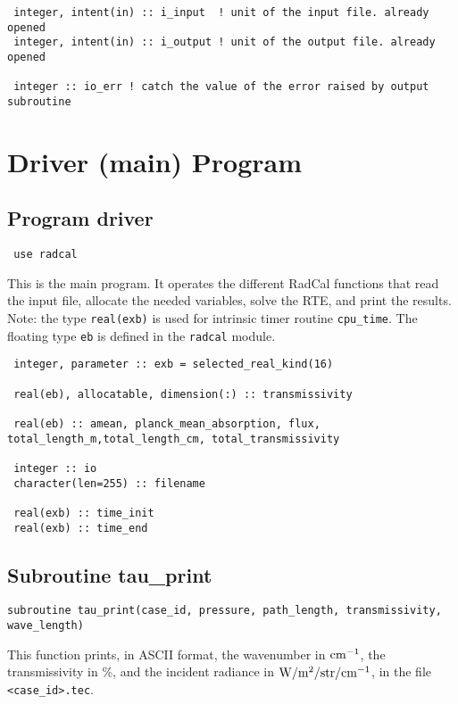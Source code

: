 \begin{lstlisting}
 integer, intent(in) :: i_input  ! unit of the input file. already opened
 integer, intent(in) :: i_output ! unit of the output file. already opened

 integer :: io_err ! catch the value of the error raised by output subroutine
\end{lstlisting}

\section{Driver (main) Program}
\subsection{Program driver}
\label{prog:driver}


\begin{lstlisting}
 use radcal

\end{lstlisting}

This is the main program. It operates the different RadCal functions that read the input file, allocate the needed variables, solve the RTE, and print the results. Note: the type \verb=real(exb)= is used for intrinsic timer routine \verb=cpu_time=. The floating type \verb=eb= is defined in the \verb=radcal= module.

\begin{lstlisting}
 integer, parameter :: exb = selected_real_kind(16)

 real(eb), allocatable, dimension(:) :: transmissivity

 real(eb) :: amean, planck_mean_absorption, flux, total_length_m,total_length_cm, total_transmissivity

 integer :: io
 character(len=255) :: filename

 real(exb) :: time_init
 real(exb) :: time_end
\end{lstlisting}

\subsection{Subroutine tau\_print}
\label{sub:tau_print}

\begin{lstlisting}
subroutine tau_print(case_id, pressure, path_length, transmissivity, wave_length)
\end{lstlisting}
This function prints, in ASCII format, the wavenumber in $\rm cm^{-1}$, the transmissivity in \%, and the incident radiance in $\rm W/m^{2}/str/cm^{-1}$, in the file \verb=<case_id>.tec=.

